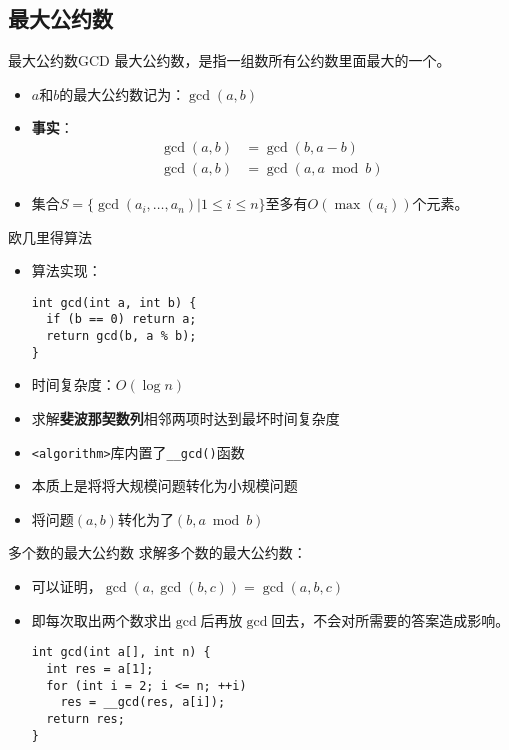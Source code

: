 \subsection{最大公约数}
\begin{frame}[fragile]{最大公约数}{GCD}
  最大公约数，是指一组数所有公约数里面最大的一个。\vspace{0.1cm}
  \pause
  \begin{itemize}
    \item $a$和$b$的最大公约数记为：$\gcd(a, b)$
    \pause
    \item \textbf{事实}：
      $$
      \begin{aligned}
        \gcd(a,b)&=\gcd(b,a-b) \\ 
        \gcd(a,b)&=\gcd(a,a\bmod b)
      \end{aligned}
      $$
    \pause
    \item 集合$S=\{\gcd(a_i,\dots,a_n)|1 \leq i\leq n\}$至多有$O(\max(a_i))$个元素。
  \end{itemize}
\end{frame}

\begin{frame}[fragile]{欧几里得算法}
  \begin{itemize}
    \item 算法实现：
    \begin{lstlisting}
int gcd(int a, int b) {
  if (b == 0) return a;
  return gcd(b, a % b);
}
    \end{lstlisting}
    \item 时间复杂度：$O(\log{n})$
    \pause
    \item 求解\textbf{斐波那契数列}相邻两项时达到最坏时间复杂度
    \pause
    \item \lstinline|<algorithm>|库内置了\lstinline|__gcd()|函数
    \pause
    \item 本质上是将将大规模问题转化为小规模问题
    \item 将问题$(a,b)$转化为了$(b,a\bmod b)$
  \end{itemize}
\end{frame}

\begin{frame}[fragile]{多个数的最大公约数}
  求解多个数的最大公约数：
  \begin{itemize}
    \item 可以证明，$\gcd(a,\gcd(b,c))=\gcd(a,b,c)$
    \item 即每次取出两个数求出$\gcd$后再放$\gcd$回去，不会对所需要的答案造成影响。
    \pause
    \begin{lstlisting}
int gcd(int a[], int n) {
  int res = a[1];
  for (int i = 2; i <= n; ++i)
    res = __gcd(res, a[i]);
  return res;
}
    \end{lstlisting}
  \end{itemize}
\end{frame}

